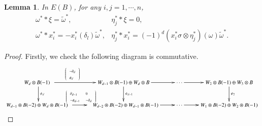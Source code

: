 \documentclass[a4paper,10pt]{amsart}
\newtheorem{lemma}[theorem]{Lemma}
\theoremstyle{definition}
\numberwithin{equation}{section}
\begin{document}
\begin{lemma}\label{lemma: E^d(B) E^1(B)}
In $E(B)$, for any $i,j=1,\cdots,n$,
$$
\begin{array}{ll}
 \omega^*\ast\xi= \widetilde{\omega}^*,&\eta_j^*\ast\xi=0,\\
\omega^*\ast x^*_i= -x_i^*(\delta_l)\widetilde{\omega}^*, &\eta_j^*\ast x_i^*=(-1)^d(x_i^*\sigma\otimes\eta_j^*)(\omega) \widetilde{\omega}^*.
\end{array}
$$
\end{lemma}

\begin{proof}Firstly, we check the following diagram is commutative.
$${\small
\xymatrix{
W_d\otimes B(-1)\ \ \ar[r]^(0.4){\scriptscriptstyle \left({\scriptscriptstyle\begin{array}{l}{\scriptstyle -\partial_d} \\ {\scriptstyle\phi_d}\end{array}}\right)}\ar[d]^{\psi_{d}}
& W_{d-1}\otimes B(-1)\oplus W_d\otimes B\ar[r]\ar[d]^{\psi_{d-1}}
&\cdots\ar[r]
&W_2\otimes B(-1)\oplus W_{3}\otimes B\ar[d]^{\psi_{2}}
\\
W_{d-1}\otimes B(-2)\oplus W_d\otimes B(-1)\ \ \ar[r]^{\scriptscriptstyle\left({\scriptscriptstyle\begin{array}{ll}{\scriptstyle \partial_{d-1} }& {\scriptstyle0} \\ {\scriptstyle-\phi_{d-1} }&{\scriptstyle -\partial_{d}}\end{array}}\right)}
&
\ \ \ W_{d-2}\otimes B(-2)\oplus W_{d-1}\otimes B(-1)\ar[r]
&\cdots\ar[r]
&W_1\otimes B(-2)\oplus W_{2}\otimes B(-1)
}
}$$
\end{proof}
\end{document}
